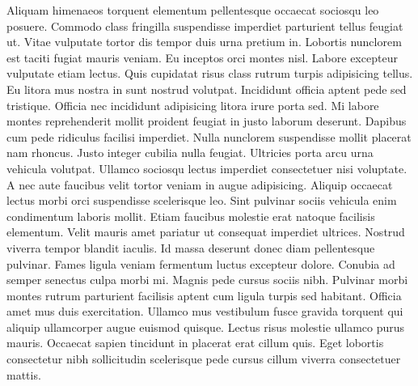 Aliquam himenaeos torquent elementum pellentesque occaecat sociosqu leo posuere. Commodo class fringilla suspendisse imperdiet parturient tellus feugiat ut. Vitae vulputate tortor dis tempor duis urna pretium in. Lobortis nunclorem est taciti fugiat mauris veniam. Eu inceptos orci montes nisl. Labore excepteur vulputate etiam lectus. Quis cupidatat risus class rutrum turpis adipisicing tellus. Eu litora mus nostra in sunt nostrud volutpat.
Incididunt officia aptent pede sed tristique. Officia nec incididunt adipisicing litora irure porta sed. Mi labore montes reprehenderit mollit proident feugiat in justo laborum deserunt. Dapibus cum pede ridiculus facilisi imperdiet. Nulla nunclorem suspendisse mollit placerat nam rhoncus. Justo integer cubilia nulla feugiat. Ultricies porta arcu urna vehicula volutpat.
Ullamco sociosqu lectus imperdiet consectetuer nisi voluptate. A nec aute faucibus velit tortor veniam in augue adipisicing. Aliquip occaecat lectus morbi orci suspendisse scelerisque leo. Sint pulvinar sociis vehicula enim condimentum laboris mollit. Etiam faucibus molestie erat natoque facilisis elementum. Velit mauris amet pariatur ut consequat imperdiet ultrices. Nostrud viverra tempor blandit iaculis. Id massa deserunt donec diam pellentesque pulvinar. Fames ligula veniam fermentum luctus excepteur dolore. Conubia ad semper senectus culpa morbi mi.
Magnis pede cursus sociis nibh. Pulvinar morbi montes rutrum parturient facilisis aptent cum ligula turpis sed habitant. Officia amet mus duis exercitation. Ullamco mus vestibulum fusce gravida torquent qui aliquip ullamcorper augue euismod quisque. Lectus risus molestie ullamco purus mauris. Occaecat sapien tincidunt in placerat erat cillum quis. Eget lobortis consectetur nibh sollicitudin scelerisque pede cursus cillum viverra consectetuer mattis.

